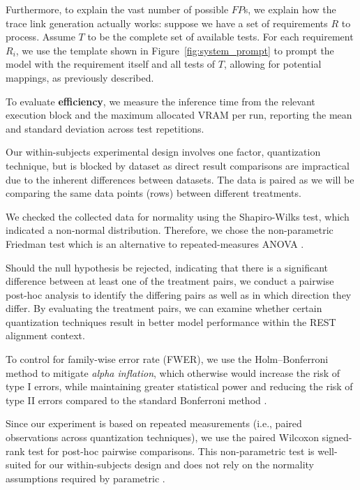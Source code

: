 \documentclass[conference]{IEEEtran}
\begin{document}
Furthermore, to explain the vast number of possible $FP$s, we explain how the trace link generation actually works: suppose we have a set of requirements $R$ to process. Assume $T$ to be the complete set of available tests. For each requirement $R_i$, we use the template shown in Figure~\ref{fig:system_prompt} to prompt the model with the requirement itself and all tests of $T$, allowing for potential mappings, as previously described.

To evaluate \textbf{efficiency}, we measure the inference time from the relevant execution block and the maximum allocated VRAM per run, reporting the mean and standard deviation across test repetitions.

Our within-subjects experimental design involves one factor, quantization technique, but is blocked by dataset as direct result comparisons are impractical due to the inherent differences between datasets. The data is paired as we will be comparing the same data points (rows) between different treatments. 

We checked the collected data for normality using the Shapiro-Wilks test, which indicated a non-normal distribution. Therefore, we chose the non-parametric Friedman test which is an alternative to repeated-measures ANOVA \cite{mccrum2008statisticalTests}.

Should the null hypothesis be rejected, indicating that there is a significant difference between at least one of the treatment pairs, we conduct a pairwise post-hoc analysis to identify the differing pairs as well as in which direction they differ. By evaluating the treatment pairs, we can examine whether certain quantization techniques result in better model performance within the REST alignment context. 

To control for family-wise error rate (FWER), we use the Holm–Bonferroni method to mitigate \textit{alpha inflation}, which otherwise would increase the risk of type I errors, while maintaining greater statistical power and reducing the risk of type II errors compared to the standard Bonferroni method \cite{abdi2010HolmBonferroni}.

Since our experiment is based on repeated measurements (i.e., paired observations across quantization techniques), we use the paired Wilcoxon signed-rank test for post-hoc pairwise comparisons. This non-parametric test is well-suited for our within-subjects design and does not rely on the normality assumptions required by parametric \cite{woolson2005wilcoxon}.
\end{document}
